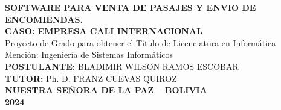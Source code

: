 \begin{titlepage}
\begin{center}
    {\textbf{SOFTWARE PARA VENTA DE PASAJES Y ENVIO DE ENCOMIENDAS.}}\\
    {\textbf{CASO: EMPRESA CALI INTERNACIONAL}}\\
    {Proyecto de Grado para obtener el Título de Licenciatura en Informática}\\
    Mención: Ingeniería de Sistemas Informáticos\\

    \textbf{POSTULANTE:} BLADIMIR WILSON RAMOS ESCOBAR\\
    \textbf{TUTOR:} Ph. D. FRANZ CUEVAS QUIROZ\\
    \textbf{NUESTRA SEÑORA DE LA PAZ – BOLIVIA}\\
    \textbf{2024}\\
  \end{center}
\end{titlepage}